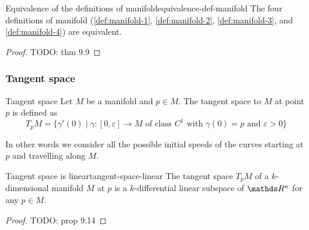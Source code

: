 \documentclass[12pt]{extarticle}
\begin{document}
\begin{theorem}{Equivalence of the definitions of manifold}{equivalence-def-manifold}
	The four definitions of manifold (\cref{def:manifold-1}, \cref{def:manifold-2},
	\cref{def:manifold-3}, and \cref{def:manifold-4}) are equivalent.
\end{theorem}
\begin{proof}
	TODO: thm 9.9
\end{proof}

\subsubsection{Tangent space}

\begin{definition}{Tangent space}
	Let $M$ be a manifold and $p \in M$. The tangent space to $M$ at point $p$ is defined as
	\begin{equation}
		T_p M = \{ \gamma'(0) \mid \gamma: [0, \varepsilon] \to M \text{ of class } C^1 \text{ with }
		\gamma(0) = p \text{ and } \varepsilon > 0 \}
	\end{equation}
\end{definition}
In other words we consider all the possible initial speeds of the curves starting at $p$ and
travelling along $M$.

\begin{proposition}{Tangent space is linear}{tangent-space-linear}
	The tangent space $T_p M$ of a $k$-dimensional manifold $M$ at $p$ is a $k$-differential linear
	subspace of $\R^n$ for any $p \in M$.
\end{proposition}

\begin{proof}
	TODO: prop 9.14
\end{proof}
\end{document}
